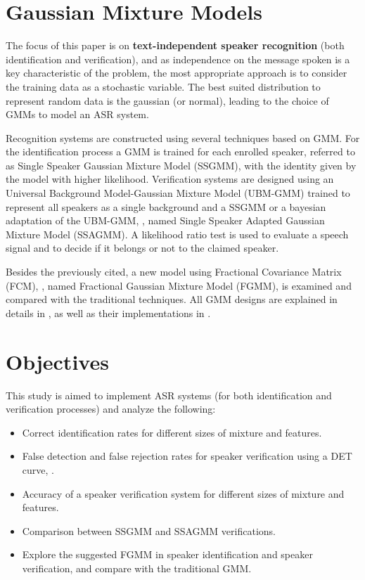 \section{Gaussian Mixture Models}
\label{sec:gmm}

The focus of this paper is on \textbf{text-independent speaker recognition} (both identification and verification), and as independence on the message spoken is a key characteristic of the problem, the most appropriate approach is to consider the training data as a stochastic variable. The best suited distribution to represent random data is the gaussian (or normal), leading to the choice of GMMs to model an ASR system.

Recognition systems are constructed using several techniques based on GMM. For the identification process a GMM is trained for each enrolled speaker, referred to as Single Speaker Gaussian Mixture Model (SSGMM), with the identity given by the model with higher likelihood. Verification systems are designed using an Universal Background Model-Gaussian Mixture Model (UBM-GMM) trained to represent all speakers as a single background and a SSGMM or a bayesian adaptation of the UBM-GMM, , named Single Speaker Adapted Gaussian Mixture Model (SSAGMM). A likelihood ratio test is used to evaluate a speech signal and to decide if it belongs or not to the claimed speaker.

Besides the previously cited, a new model using Fractional Covariance Matrix (FCM), , named Fractional Gaussian Mixture Model (FGMM), is examined and compared with the traditional techniques. All GMM designs are explained in details in , as well as their implementations in .


\section{Objectives}

This study is aimed to implement ASR systems (for both identification and verification processes) and analyze the following:

\begin{itemize}\itemsep0pt
    \item Correct identification rates for different sizes of mixture and features.
    \item False detection and false rejection rates for speaker verification using a DET curve, .
    \item Accuracy of a speaker verification system for different sizes of mixture and features.
    \item Comparison between SSGMM and SSAGMM verifications.
    \item Explore the suggested FGMM in speaker identification and speaker verification, and compare with the traditional GMM.
\end{itemize}

